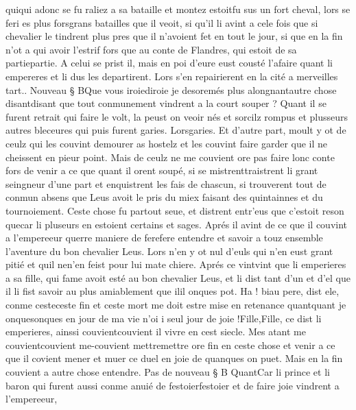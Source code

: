 \documentclass{article}
\begin{document}
\begin{pages}
   quiqui adonc se fu raliez a sa bataille et montez 
   estoitfu sus un fort cheval, 
   lors se feri es plus forsgrans batailles que il veoit, 
   si qu’il li avint a cele fois que si chevalier le tindrent plus pres que il n’avoient fet en tout le jour, 
   si que en la fin n’ot a qui avoir 
   l’estrif fors que au 
   conte de Flandres,
   qui estoit de sa partiepartie. A celui se prist il, mais en poi d'eure eust cousté
   l'afaire quant li empereres et li dus les departirent. Lors s'en repairierent en la cité a merveilles tart.. 
   Nouveau § BQue vous iroiediroie je 
      desoremés plus 
      alongnantautre chose disantdisant 
   que tout conmunement vindrent a la court souper ? 
   Quant il se furent retrait qui faire le volt, 
   la peust on veoir nés et sorcilz rompus et plusseurs autres bleceures qui puis furent 
   garies. Lorsgaries. Et d'autre part, moult y ot de ceulz qui les couvint demourer as hostelz
   et les couvint faire garder que il ne cheissent en pieur point. 
   Mais de ceulz ne me couvient ore pas faire lonc conte fors de venir a ce que 
   quant il orent soupé, si se mistrenttraistrent li grant seingneur d’une part 
   et enquistrent les fais de chascun, 
               si trouverent tout de conmun absens que Leus avoit le pris du miex faisant des 
               quintainnes et du tournoiement. Ceste chose fu partout seue, et distrent entr’eus que c’estoit reson 
   quecar li pluseurs en estoient certains et sages. 
   Aprés il avint de ce que il couvint a l’empereeur querre maniere de 
   ferefere entendre et savoir a touz ensemble 
   l’aventure du bon chevalier Leus. Lors n’en 
   y ot nul d’euls qui n’en eust grant pitié et quil nen'en feist 
   pour lui mate chiere. 
   Aprés ce vintvint que li emperieres 
   a sa fille, 
      qui fame avoit esté au bon chevalier Leus, et li dist tant d’un et d’el que il li fist savoir 
   au plus amiablement que ilil onques pot.
   Ha ! biau pere, dist ele, conme 
      cesteceste fin et ceste mort me doit estre mise en retenance 
      quantquant je 
      onquesonques en jour de ma vie n’oi i seul jour de joie !Fille,Fille, ce 
      dist li emperieres, ainssi 
      couvientcouvient il vivre en cest siecle.
   Mes atant me couvientcouvient me-couvient 
      mettremettre ore fin en ceste chose et venir
   a ce que il covient mener 
      et muer ce duel en 
   joie de quanques on puet. Mais en la fin couvient a autre chose entendre. \pend
\pstart Pas de nouveau § B
   QuantCar li prince et li baron qui furent aussi conme 
   anuié de festoierfestoier et de faire joie 
   vindrent a l’empereeur, 

\end{pages}
\end{document}

